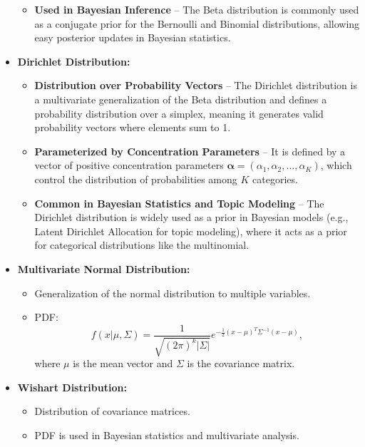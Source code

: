 \documentclass[12pt,a4paper]{article}
\begin{document}
\begin{itemize}
\begin{itemize}
    \item \textbf{Used in Bayesian Inference} – The Beta distribution is commonly used as a conjugate prior for the Bernoulli and Binomial distributions, allowing easy posterior updates in Bayesian statistics.
\end{itemize}
    \item \textbf{Dirichlet Distribution:}
    \begin{itemize}
     \item \textbf{Distribution over Probability Vectors} – The Dirichlet distribution is a multivariate generalization of the Beta distribution and defines a probability distribution over a simplex, meaning it generates valid probability vectors where elements sum to 1.
    
    \item \textbf{Parameterized by Concentration Parameters} – It is defined by a vector of positive concentration parameters \( \boldsymbol{\alpha} = (\alpha_1, \alpha_2, \dots, \alpha_K) \), which control the distribution of probabilities among \( K \) categories.
    
    \item \textbf{Common in Bayesian Statistics and Topic Modeling} – The Dirichlet distribution is widely used as a prior in Bayesian models (e.g., Latent Dirichlet Allocation for topic modeling), where it acts as a prior for categorical distributions like the multinomial.
    \end{itemize}
    \item \textbf{Multivariate Normal Distribution:}
    \begin{itemize}
        \item Generalization of the normal distribution to multiple variables.
        \item PDF:
        \[ f(x | \mu, \Sigma) = \frac{1}{\sqrt{(2\pi)^k |\Sigma|}} e^{-\frac{1}{2}(x - \mu)^T \Sigma^{-1} (x - \mu)}, \]
        where $\mu$ is the mean vector and $\Sigma$ is the covariance matrix.
    \end{itemize}
    \item \textbf{Wishart Distribution:}
    \begin{itemize}
        \item Distribution of covariance matrices.
        \item PDF is used in Bayesian statistics and multivariate analysis.
    \end{itemize}
\end{itemize}
\end{document}
